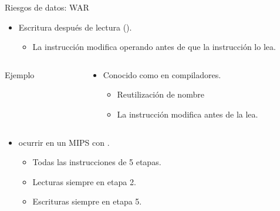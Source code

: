 \begin{frame}[t,fragile]{Riesgos de datos: WAR}
\begin{itemize}
  \item Escritura después de lectura ().
    \begin{itemize}
      \item La instrucción  modifica operando antes de que la
            instrucción  lo lea.
    \end{itemize}
\end{itemize}
\begin{columns}
\begin{column}{.25\textwidth}
\begin{block}{Ejemplo}

\end{block}
\end{column}
\begin{column}{.75\textwidth}
\begin{itemize}
  \item Conocido como  en compiladores.
    \begin{itemize}
      \item Reutilización de nombre
      \item La instrucción  modifica 
            antes de  la lea.
    \end{itemize}
\end{itemize}
\end{column}
\end{columns}
\begin{itemize}
  \item {} ocurrir en un MIPS con .
  \begin{itemize}
    \item Todas las instrucciones de 5 etapas.
    \item Lecturas siempre en etapa 2.
    \item Escrituras siempre en etapa 5.
  \end{itemize}
\end{itemize}
\end{frame}

